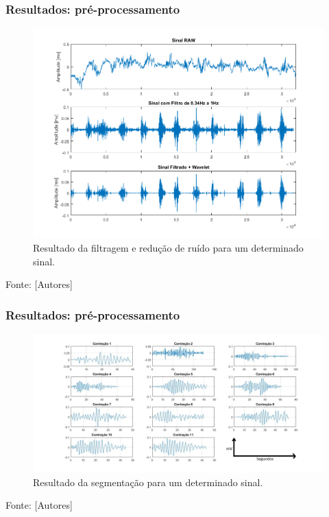 \documentclass{beamer}
\begin{document}
\begin{frame}
	\frametitle{Resultados: pré-processamento}	
	
	\begin{figure}[H]
		\caption{\label{sinais} Resultado da filtragem e redução de ruído para um determinado sinal.}
		\begin{center}
			\includegraphics[scale=0.33]{imagens/sinais.png} 		
		\end{center}
	\end{figure}
	
	Fonte: [Autores]
	
\end{frame}


\begin{frame}
	\frametitle{Resultados: pré-processamento}	
	
	\begin{figure}[H]
		\caption{\label{contracao} Resultado da segmentação para um determinado sinal.}
		\begin{center}
			\includegraphics[scale=0.35]{imagens/contra.jpg} 		
		\end{center}
	\end{figure}
	
	Fonte: [Autores]
	
\end{frame}
\end{document}
